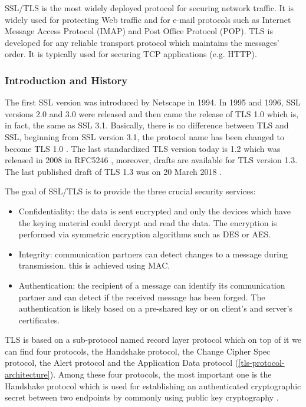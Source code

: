 \ac{SSL}/\ac{TLS} is the most widely deployed protocol for
securing network traffic. It is widely used for protecting Web traffic and for e-mail protocols such as
Internet Message Access Protocol (IMAP) and Post Office Protocol (POP). \ac{TLS} is developed for any reliable transport
protocol which maintains the messages' order. It is typically used for securing \ac{TCP} applications (e.g. HTTP).

\subsubsection{Introduction and History}

The first \ac{SSL} version was introduced by Netscape in 1994. In 1995 and 1996, \ac{SSL} versions 2.0 and 3.0 were released
and then came the release of \ac{TLS} 1.0 which is, in fact, the same as \ac{SSL} 3.1. Basically, there is no
difference between \ac{TLS} and SSL, beginning from \ac{SSL} version 3.1, the protocol name has been changed
to become \ac{TLS} 1.0 \cite{SSLHistory}. The last standardized \ac{TLS} version today is 1.2 which was released in 2008 in RFC5246 \cite{rfc5246}
, moreover, drafts are available for \ac{TLS} version 1.3. The last published draft of \ac{TLS} 1.3 was on 20 March 2018 \cite{draftTLSv1.3}.

The goal of SSL/\ac{TLS} is to provide the three crucial security services:

\begin{itemize}
\setlength{\labelwidth}{10pt}
  \item Confidentiality: the data is sent encrypted and only the devices which have the keying material could decrypt and read the data.
  The encryption is performed via symmetric encryption algorithms such as \ac{DES} or \ac{AES}.

  \item Integrity: communication partners can detect changes to a message during transmission.
  this is achieved using \ac{MAC}.

  \item Authentication: the recipient of a message can identify its communication
partner and can detect if the received message has been forged. The authentication
is likely based on a pre-shared key or on client's and server's certificates.
\end{itemize}

\ac{TLS} is based on a sub-protocol named record layer protocol which on
top of it we can find four protocols, the Handshake protocol, the Change Cipher Spec protocol,
the Alert protocol and the Application Data protocol (\autoref{tls-protocol-architecture}). Among these four protocols, the most
important one is the Handshake protocol which is used for establishing an authenticated
cryptographic secret between two endpoints by commonly using public key cryptography \cite{rfc5246}.

